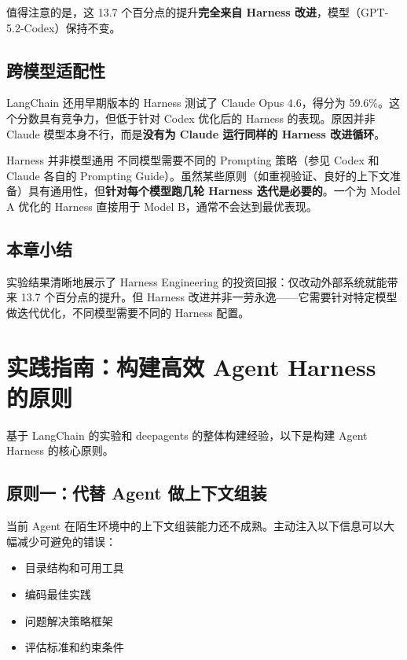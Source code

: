 \documentclass[a4paper]{article}
\begin{document}
值得注意的是，这 13.7 个百分点的提升\textbf{完全来自 Harness 改进}，模型（GPT-5.2-Codex）保持不变。

\subsection{跨模型适配性}

LangChain 还用早期版本的 Harness 测试了 Claude Opus 4.6，得分为 59.6\%。这个分数具有竞争力，但低于针对 Codex 优化后的 Harness 的表现。原因并非 Claude 模型本身不行，而是\textbf{没有为 Claude 运行同样的 Harness 改进循环}。

\begin{warningbox}{Harness 并非模型通用}
不同模型需要不同的 Prompting 策略（参见 Codex 和 Claude 各自的 Prompting Guide）。虽然某些原则（如重视验证、良好的上下文准备）具有通用性，但\textbf{针对每个模型跑几轮 Harness 迭代是必要的}。一个为 Model A 优化的 Harness 直接用于 Model B，通常不会达到最优表现。
\end{warningbox}

\subsection{本章小结}

实验结果清晰地展示了 Harness Engineering 的投资回报：仅改动外部系统就能带来 13.7 个百分点的提升。但 Harness 改进并非一劳永逸——它需要针对特定模型做迭代优化，不同模型需要不同的 Harness 配置。


\section{实践指南：构建高效 Agent Harness 的原则}

基于 LangChain 的实验和 deepagents 的整体构建经验，以下是构建 Agent Harness 的核心原则。

\subsection{原则一：代替 Agent 做上下文组装}

当前 Agent 在陌生环境中的上下文组装能力还不成熟。主动注入以下信息可以大幅减少可避免的错误：

\begin{itemize}[leftmargin=1.5em]
    \item 目录结构和可用工具
    \item 编码最佳实践
    \item 问题解决策略框架
    \item 评估标准和约束条件
\end{itemize}
\end{document}
